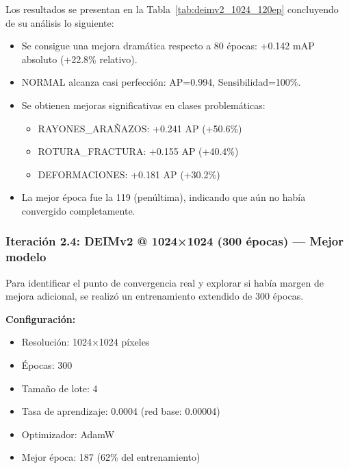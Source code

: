 Los resultados se presentan en la Tabla~\ref{tab:deimv2_1024_120ep} concluyendo de su análisis lo siguiente:
\begin{itemize}
    \item Se consigue una mejora dramática respecto a 80 épocas: +0.142 mAP absoluto (+22.8\% relativo).
    \item NORMAL alcanza casi perfección: AP=0.994, Sensibilidad=100\%.
    \item Se obtienen mejoras significativas en clases problemáticas:
    \begin{itemize}
        \item \mbox{RAYONES\_ARAÑAZOS}: +0.241 AP (+50.6\%)
        \item \mbox{ROTURA\_FRACTURA}: +0.155 AP (+40.4\%)
        \item DEFORMACIONES: +0.181 AP (+30.2\%)
    \end{itemize}
    \item La mejor época fue la 119 (penúltima), indicando que aún no había convergido completamente.
\end{itemize}

\subsubsection{Iteración 2.4: DEIMv2 @ 1024×1024 (300 épocas) --- Mejor modelo}

Para identificar el punto de convergencia real y explorar si había margen de mejora adicional, se realizó un entrenamiento extendido de 300 épocas.

\textbf{Configuración:}
\begin{itemize}
    \item Resolución: 1024×1024 píxeles
    \item Épocas: 300
    \item Tamaño de lote: 4
    \item Tasa de aprendizaje: 0.0004 (red base: 0.00004)
    \item Optimizador: AdamW
    \item Mejor época: 187 (62\% del entrenamiento)
\end{itemize}

